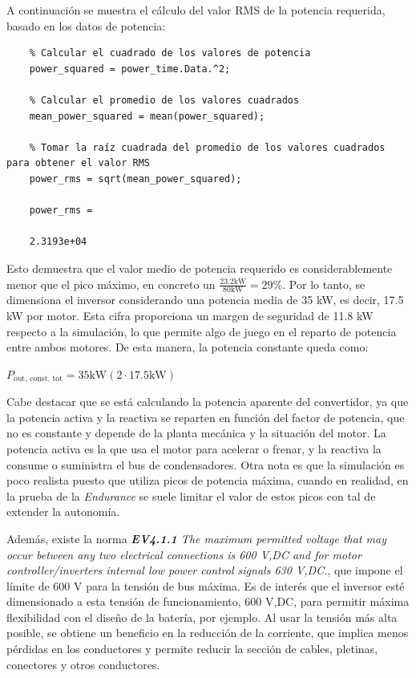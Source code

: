 A continuación se muestra el cálculo del valor RMS de la potencia requerida, basado en los datos de potencia:

\begin{verbatim}
	% Calcular el cuadrado de los valores de potencia
	power_squared = power_time.Data.^2;
	
	% Calcular el promedio de los valores cuadrados
	mean_power_squared = mean(power_squared);
	
	% Tomar la raíz cuadrada del promedio de los valores cuadrados para obtener el valor RMS
	power_rms = sqrt(mean_power_squared);
	
	power_rms =
	
	2.3193e+04
\end{verbatim}


Esto demuestra que el valor medio de potencia requerido es considerablemente menor que el pico máximo, en concreto un \(\frac{23.2 \text{kW}}{80 \text{kW}} = 29\%\). Por lo tanto, se dimensiona el inversor considerando una potencia media de 35 kW, es decir, 17.5 kW por motor. Esta cifra proporciona un margen de seguridad de 11.8 kW respecto a la simulación, lo que permite algo de juego en el reparto de potencia entre ambos motores. De esta manera, la potencia constante queda como:

\(P_{\text{out, const, tot}} = 35 \text{kW} (2 \cdot 17.5 \text{kW})\)

Cabe destacar que se está calculando la potencia aparente del convertidor, ya que la potencia activa y la reactiva se reparten en función del factor de potencia, que no es constante y depende de la planta mecánica y la situación del motor. La potencia activa es la que usa el motor para acelerar o frenar, y la reactiva la consume o suministra el bus de condensadores. Otra nota es que la simulación es poco realista puesto que utiliza picos de potencia máxima, cuando en realidad, en la prueba de la \textit{Endurance} se suele limitar el valor de estos picos con tal de extender la autonomía.

Además, existe la norma \textit{\textbf{EV4.1.1} The maximum permitted voltage that may occur between any two electrical connections is 600 V,DC and for motor controller/inverters internal low power control signals 630 V,DC.}, que impone el límite de 600 V para la tensión de bus máxima. Es de interés que el inversor esté dimensionado a esta tensión de funcionamiento, 600 V,DC, para permitir máxima flexibilidad con el diseño de la batería, por ejemplo. Al usar la tensión más alta posible, se obtiene un beneficio en la reducción de la corriente, que implica menos pérdidas en los conductores y permite reducir la sección de cables, pletinas, conectores y otros conductores.

